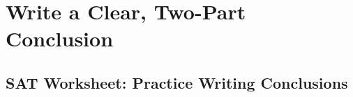 \section{Write a Clear, Two-Part Conclusion}
\subsection{SAT Worksheet: Practice Writing Conclusions}